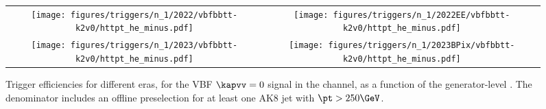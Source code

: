 
    \begin{figure}[H]
        \centering
        \begin{tabular}{cc}
            \texttt{[image: figures/triggers/n\_1/2022/vbfbbtt-k2v0/httpt\_he\_minus.pdf]} &
            \texttt{[image: figures/triggers/n\_1/2022EE/vbfbbtt-k2v0/httpt\_he\_minus.pdf]} \\[1ex]
            \texttt{[image: figures/triggers/n\_1/2023/vbfbbtt-k2v0/httpt\_he\_minus.pdf]} &
            \texttt{[image: figures/triggers/n\_1/2023BPix/vbfbbtt-k2v0/httpt\_he\_minus.pdf]}
            \label{fig}
        \end{tabular}
\caption{Trigger efficiencies for different eras, for the VBF \HHbbtt $\kapvv=0$ signal in the \tauhe channel, as a function of the generator-level \htata \pt. The denominator includes an offline preselection for at least one AK8 jet with $\pt > 250\GeV$.}
\label{fig:triggers_n-1_vbfbbtt-k2v0_he_httpt}
\end{figure}

